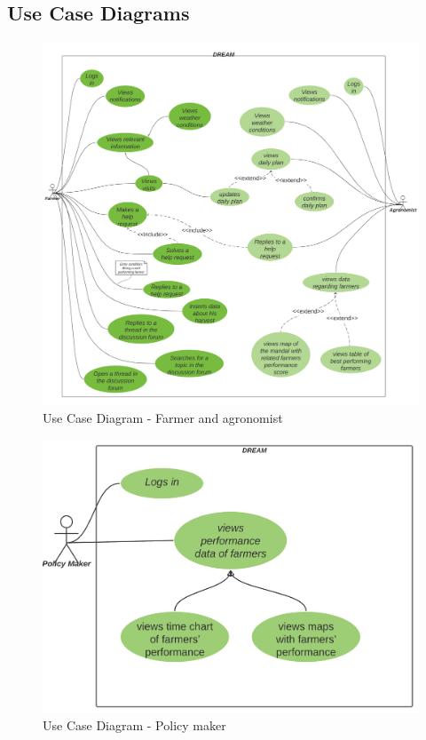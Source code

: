 \subsection{Use Case Diagrams}
\begin{center}
\begin{figure}[H]
  \includegraphics[width=\textwidth,height=\textheight,keepaspectratio]{./Images/Use case Agronomist Farmer.png}
  \caption{Use Case Diagram - Farmer and agronomist}
\end{figure}

\begin{figure}[H]
  \includegraphics[width=\textwidth,height=\textheight,keepaspectratio]{./Images/Use case Policy Maker.png}
  \caption{Use Case Diagram - Policy maker}
\end{figure}
\end{center}
